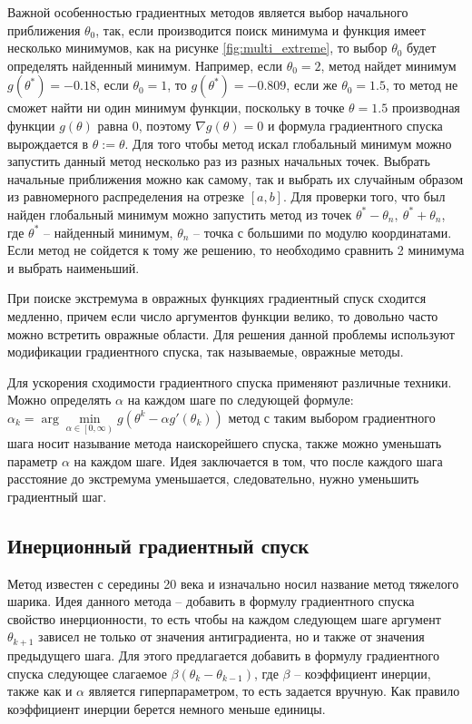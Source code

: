 Важной особенностью градиентных методов является выбор начального приближения $\theta_0$, так, если производится поиск минимума и функция имеет несколько минимумов, как на рисунке \ref{fig:multi_extreme}, то выбор $\theta_0$ будет определять найденный минимум. Например, если $\theta_0 = 2$, метод найдет минимум $g(\theta^*) = -0.18$, если $\theta_0 = 1$, то $g(\theta^*) = -0.809$, если же $\theta_0 = 1.5$, то метод не сможет найти ни один минимум функции, поскольку в точке $\theta = 1.5$ производная функции $g(\theta)$ равна 0, поэтому $\nabla g(\theta) = 0$ и формула градиентного спуска вырождается в $\theta := \theta$. Для того чтобы метод искал глобальный минимум можно запустить данный метод несколько раз из разных начальных точек. Выбрать начальные приближения можно как самому, так и выбрать их случайным образом из равномерного распределения на отрезке $[ a, b ]$. Для проверки того, что был найден глобальный минимум можно запустить метод из точек $\theta^* - \theta_n,~\theta^* + \theta_n$, где $\theta^*$ -- найденный минимум, $\theta_n$ -- точка с большими по модулю координатами. Если метод не сойдется к тому же решению, то необходимо сравнить 2 минимума и выбрать наименьший.

При поиске экстремума в овражных функциях градиентный спуск сходится медленно, причем если число аргументов функции велико, то довольно часто можно встретить овражные области. Для решения данной проблемы используют модификации градиентного спуска, так называемые, овражные методы.

Для ускорения сходимости градиентного спуска применяют различные техники. Можно определять $\alpha$ на каждом шаге по следующей формуле: $\alpha_{k} = \arg \min\limits_{\alpha \in \left[  0, \infty \right) } g(\theta^k - \alpha g'(\theta_k))$ метод с таким выбором градиентного шага носит называние метода наискорейшего спуска, также можно уменьшать параметр $\alpha$ на каждом шаге. Идея заключается в том, что после каждого шага расстояние до экстремума уменьшается, следовательно, нужно уменьшить градиентный шаг.


\subsection{Инерционный градиентный спуск}

Метод известен с середины 20 века и изначально носил название метод тяжелого шарика. Идея данного метода -- добавить в формулу градиентного спуска свойство инерционности, то есть чтобы на каждом следующем шаге аргумент $\theta_{k+1}$ зависел не только от значения антиградиента, но и также от значения предыдущего шага. Для этого предлагается добавить в формулу градиентного спуска следующее слагаемое $\beta (\theta_k - \theta_{k-1})$, где $\beta$ -- коэффициент инерции, также как и $\alpha$ является гиперпараметром, то есть задается вручную. Как правило коэффициент инерции берется немного меньше единицы.

